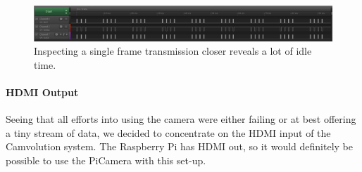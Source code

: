 \begin{figure}
    \centering
    \includegraphics[width=\linewidth]{img/logic/1frame}
    \caption{Inspecting a single frame transmission closer reveals a lot of idle time.}
    \label{fig:Logic1Frame}
\end{figure}

\paragraph{HDMI Output}
Seeing that all efforts into using the camera were either failing or at best offering a tiny stream of data,
we decided to concentrate on the HDMI input of the Camvolution system.
The Raspberry Pi has HDMI out, so it would definitely be possible to use the PiCamera with this set-up.
